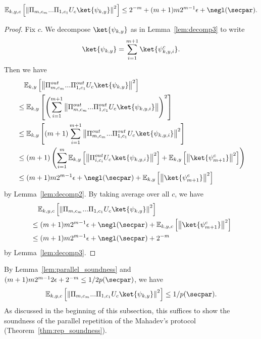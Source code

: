 \begin{lemma}\label{lem:parallel_soundness}
\begin{align*}
\mathbb{E}_{k,y,c}\left[\left\|\Pi_{m,c_m}...\Pi_{1,c_1}U_{c}\ket{\psi_{k,y}}\right\|^{2}\right]\leq 2^{-m} + (m+1)m 2^{m-1}\epsilon +\negl(\secpar).
\end{align*}
\end{lemma}
\begin{proof}
Fix $c$.
We decompose $\ket{\psi_{k,y}}$ as in Lemma~\ref{lem:decomp3} to write 
\begin{align*}
\ket{\psi_{k,y}}=\sum_{i=1}^{m+1}\ket{\psi_{k,y,i}^{c}}.
\end{align*}
Then we have 
\begin{align*}
&~~~\mathbb{E}_{k,y}\left[\left\|\Pi_{m,c_m}^{out}...\Pi_{1,c_1}^{out}U_{c}\ket{\psi_{k,y}}\right\|^2\right]\\
&\leq \mathbb{E}_{k,y}\left[\left(\sum_{i=1}^{m+1}\left\|\Pi_{m,c_m}^{out}...\Pi_{1,c_1}^{out}U_{c}\ket{\psi_{k,y,i}}\right\|\right)^2\right]\\
&\leq \mathbb{E}_{k,y}\left[(m+1)\sum_{i=1}^{m+1}\left\|\Pi_{m,c_m}^{out}...\Pi_{1,c_1}^{out}U_{c}\ket{\psi_{k,y,i}}\right\|^2\right]\\
&\leq (m+1)\left(\sum_{i=1}^{m}\mathbb{E}_{k,y}\left[\left\|\Pi_{i,c_i}^{out}U_{c}\ket{\psi_{k,y,i}}\right\|^2\right]+\mathbb{E}_{k,y}\left[\left\|\ket{\psi_{m+1}^{c}}\right\|^2\right]\right)\\
&\leq (m+1)m 2^{m-1}\epsilon+\negl(\secpar)+ \mathbb{E}_{k,y}\left[\left\|\ket{\psi_{m+1}^{c}}\right\|^2\right]
\end{align*}
by Lemma~\ref{lem:decomp2}.
By taking average over all $c$, we have 
\begin{align*}
&~~~\mathbb{E}_{k,y,c}\left[\left\|\Pi_{m,c_m}...\Pi_{1,c_1}U_{c}\ket{\psi_{k,y}}\right\|^2\right]\\
&\leq (m+1)m 2^{m-1}\epsilon+\negl(\secpar) +\mathbb{E}_{k,y,c}\left[\left\|\ket{\psi_{m+1}^{c}}\right\|^2\right]\\
&\leq (m+1)m 2^{m-1}\epsilon+\negl(\secpar) +2^{-m}
\end{align*}
by Lemma~\ref{lem:decomp3}.
\end{proof}

By Lemma~\ref{lem:parallel_soundness} and $(m+1)m2^{m-1}2\epsilon+2^{-m}\leq 1/2p(\secpar)$, we have 
\begin{align*}
    \mathbb{E}_{k,y,c}\left[\left\|\Pi_{m,c_m}...\Pi_{1,c_1}U_{c}\ket{\psi_{k,y}}\right\|^{2}\right]\leq 1/p(\secpar).
\end{align*}
As discussed in the beginning of this subsection, this suffices to show the soundness of the parallel repetition of the Mahadev's protocol (Theorem~\ref{thm:rep_soundness}).


